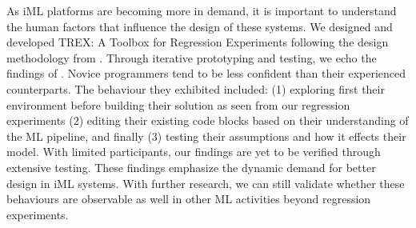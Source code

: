 \documentclass{sigchi-ext}
\begin{document}
As iML platforms are becoming more in demand, it is important to understand the human factors that influence the design of these systems. We designed and developed TREX: A Toolbox for Regression Experiments following the design methodology from \cite{nodalo2019building}. Through iterative prototyping and testing, we echo the findings of \cite{sarkar2015interactive}. Novice programmers tend to be less confident than their experienced counterparts. The behaviour they exhibited included: (1) exploring first their environment before building their solution as seen from our regression experiments (2) editing their existing code blocks based on their understanding of the ML pipeline, and finally (3) testing their assumptions and how it effects their model. With limited participants, our findings are yet to be verified through extensive testing. These findings emphasize the dynamic demand for better design in iML systems. With further research, we can still validate whether these behaviours are observable as well in other ML activities beyond regression experiments. 
\newpage
{}
 
\end{document}
